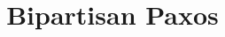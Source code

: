 \documentclass{mwhittaker}
\title{Bipartisan Paxos}
\begin{document}
\maketitle

{}




\end{document}
